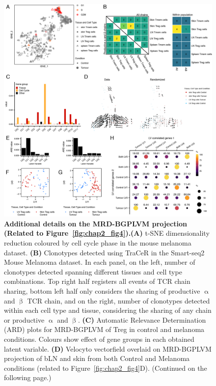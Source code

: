 \begin{figure}[pt!] 
\centering    
\includegraphics[width=1.0\textwidth]{Appendix1/Figs/appA_fig5.png} %
\caption[Additional details on the MRD-BGPLVM projection]{\textbf{Additional details on the MRD-BGPLVM projection (Related to Figure~\ref{fig:chap2_fig4}).}\newline\textbf{(A)} t-SNE dimensionality reduction coloured by cell cycle phase in the mouse melanoma dataset. \textbf{(B)} Clonotypes detected using TraCeR in the Smart-seq2 Mouse Melanoma dataset. In each panel, on the left, number of clonotypes detected spanning different tissues and cell type combinations. Top right half registers all events of TCR chain sharing, bottom left half only considers the sharing of productive ${\upalpha}$ and ${\upbeta}$ TCR chain, and on the right, number of clonotypes detected within each cell type and tissue, considering the sharing of any chain or productive ${\upalpha}$ and ${\upbeta}$. \textbf{(C)} Automatic Relevance Determination (ARD) plots for MRD-BGPLVM of Treg in control and melanoma conditions. Colours show effect of gene groups in each obtained latent variable. \textbf{(D)} Velocyto vectorfield overlaid on MRD-BGPLVM projection of bLN and skin from both Control and Melanoma conditions (related to Figure~\ref{fig:chap2_fig4}D). (Continued on the following page.)}
\label{fig:appA_fig5}
\end{figure}
